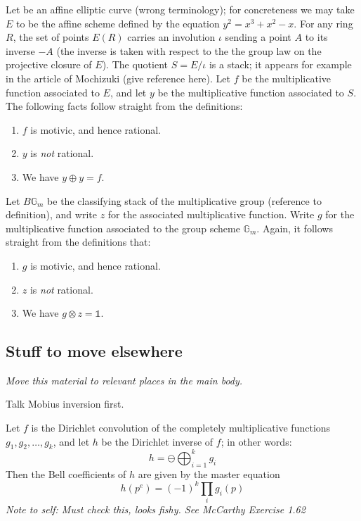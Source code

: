 \documentclass[a4paper]{article}
\begin{document}
Let be an affine elliptic curve (wrong terminology); for concreteness we may take $E$ to be the affine scheme defined by the equation $y^2 = x^3 + x^2 - x$. For any ring $R$, the set of points $E(R)$ carries an involution $\iota$ sending a point $A$ to its inverse $-A$ (the inverse is taken with respect to the the group law on the projective closure of $E$). The quotient $S = E/ \iota$ is a stack; it appears for example in the article of Mochizuki (give reference here). Let $f$ be the multiplicative function associated to $E$, and let $y$ be the multiplicative function associated to $S$. The following facts follow straight from the definitions:
\begin{enumerate}
\item $f$ is motivic, and hence rational.
\item $y$ is \emph{not} rational.
\item We have $y \oplus y = f$. 
\end{enumerate}

Let $B \mathbb{G}_m$ be the classifying stack of the multiplicative group (reference to definition), and write $z$ for the associated multiplicative function. Write $g$ for the multiplicative function associated to the group scheme $\mathbb{G}_m$. Again, it follows straight from the definitions that:
\begin{enumerate}
\item $g$ is motivic, and hence rational.
\item $z$ is \emph{not} rational.
\item We have $g \otimes z = \mathbb{1}$. 
\end{enumerate}



\subsection*{Stuff to move elsewhere}

\emph{Move this material to relevant places in the main body.}

Talk Mobius inversion first.

\begin{example}
Let $f$ is the Dirichlet convolution of the completely multiplicative functions $g_1, g_2, \ldots, g_k$, and let $h$ be the Dirichlet inverse of $f$; in other words:
$$  h = \ominus \bigoplus_{i=1}^k g_i  $$
Then the Bell coefficients of $h$ are given by the master equation
$$  h(p^e) = (-1)^k \prod_i g_i(p)  $$
\emph{Note to self: Must check this, looks fishy. See McCarthy Exercise 1.62}

\end{example}
\end{document}
